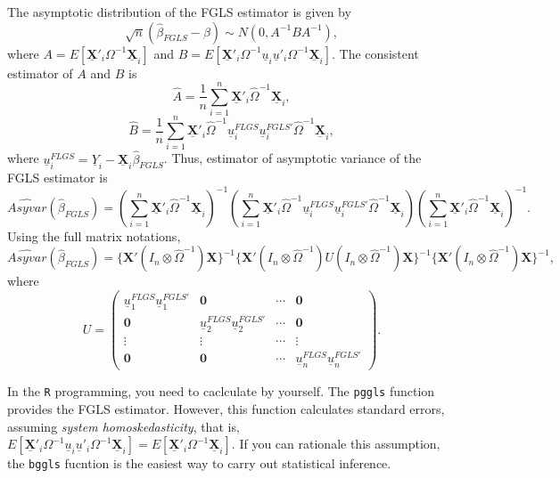\documentclass[
  12pt,
]{article}
\begin{document}
The asymptotic distribution of the FGLS estimator is given by \[
  \sqrt{n}(\hat{\beta}_{FGLS} - \beta) \sim N(0, A^{-1} B A^{-1}),
\] where
\(A = E[\underline{\mathbf{X}}'_i \Omega^{-1} \underline{\mathbf{X}}_i]\)
and
\(B = E[\underline{\mathbf{X}}'_i \Omega^{-1} \underline{u}_i \underline{u}'_i \Omega^{-1} \underline{\mathbf{X}}_i]\).
The consistent estimator of \(A\) and \(B\) is \[
  \hat{A} = \frac{1}{n} \sum_{i=1}^n \underline{\mathbf{X}}'_i \hat{\Omega}^{-1} \underline{\mathbf{X}}_i,
\] \[
  \hat{B} 
  = \frac{1}{n} \sum_{i=1}^n
  \underline{\mathbf{X}}'_i \hat{\Omega}^{-1} 
  \underline{u}^{FLGS}_i \underline{u}^{FGLS'}_i 
  \hat{\Omega}^{-1} \underline{\mathbf{X}}_i,
\] where
\(\underline{u}^{FLGS}_i = \underline{Y}_i - \underline{\mathbf{X}}_i \hat{\beta}_{FGLS}\).
Thus, estimator of asymptotic variance of the FGLS estimator is \[
  \hat{Asyvar}(\hat{\beta}_{FGLS}) =
  \left( \sum_{i=1}^n \underline{\mathbf{X}}'_i \hat{\Omega}^{-1} \underline{\mathbf{X}}_i \right)^{-1}
  \left( \sum_{i=1}^n \underline{\mathbf{X}}'_i \hat{\Omega}^{-1} 
  \underline{u}^{FLGS}_i \underline{u}^{FGLS'}_i 
  \hat{\Omega}^{-1} \underline{\mathbf{X}}_i \right)
  \left( \sum_{i=1}^n \underline{\mathbf{X}}'_i \hat{\Omega}^{-1} \underline{\mathbf{X}}_i \right)^{-1}.
\] Using the full matrix notations, \[
  \hat{Asyvar}(\hat{\beta}_{FGLS}) =
  \{ \mathbf{X}'(I_n \otimes \hat{\Omega}^{-1}) \mathbf{X} \}^{-1}
  \{ \mathbf{X}'(I_n \otimes \hat{\Omega}^{-1}) U (I_n \otimes \hat{\Omega}^{-1}) \mathbf{X} \}^{-1}
  \{ \mathbf{X}'(I_n \otimes \hat{\Omega}^{-1}) \mathbf{X} \}^{-1},
\] where \[
  U = 
  \begin{pmatrix}
    \underline{u}^{FLGS}_1 \underline{u}^{FGLS'}_1 & \mathbf{0} & \cdots & \mathbf{0} \\
    \mathbf{0} & \underline{u}^{FLGS}_2 \underline{u}^{FGLS'}_2 & \cdots & \mathbf{0} \\
    \vdots & \vdots & \cdots & \vdots \\
    \mathbf{0} & \mathbf{0} & \cdots & \underline{u}^{FLGS}_n \underline{u}^{FGLS'}_n
  \end{pmatrix}.
\]

In the \texttt{R} programming, you need to caclculate by yourself. The
\texttt{pggls} function provides the FGLS estimator. However, this
function calculates standard errors, assuming \emph{system
homoskedasticity}, that is,
\(E[\underline{\mathbf{X}}'_i \Omega^{-1} \underline{u}_i \underline{u}'_i \Omega^{-1} \underline{\mathbf{X}}_i] = E[\underline{\mathbf{X}}'_i \Omega^{-1} \underline{\mathbf{X}}_i]\).
If you can rationale this assumption, the \texttt{bggls} fucntion is the
easiest way to carry out statistical inference.
\end{document}
